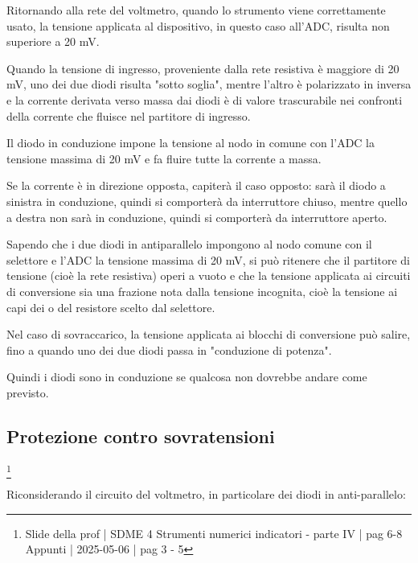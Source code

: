 Ritornando alla rete del voltmetro, quando lo strumento viene correttamente usato, la tensione applicata al dispositivo, in questo caso all'ADC, risulta non superiore a 20 mV. \newline

Quando la tensione di ingresso, proveniente dalla rete resistiva è maggiore di 20 mV, uno dei due diodi risulta "sotto soglia", mentre l'altro è polarizzato in inversa 
e la corrente derivata verso massa dai diodi è di valore trascurabile nei confronti della corrente che fluisce nel partitore di ingresso. \newline 

Il diodo in conduzione impone la tensione al nodo in comune con l'ADC la tensione massima di 20 mV e fa fluire tutte la corrente a massa. \newline 

Se la corrente è in direzione opposta, capiterà il caso opposto: sarà il diodo a sinistra in conduzione, quindi si comporterà da interruttore chiuso, mentre quello a destra non sarà in conduzione, 
quindi si comporterà da interruttore aperto. \newline 

Sapendo che i due diodi in antiparallelo impongono al nodo comune con il selettore e l'ADC la tensione massima di 20 mV, 
si può ritenere che il partitore di tensione (cioè la rete resistiva) operi a vuoto e che la tensione applicata ai circuiti di conversione sia una frazione nota dalla tensione incognita, 
cioè la tensione ai capi dei o del resistore scelto dal selettore. \newline 

Nel caso di sovraccarico, la tensione applicata ai blocchi di conversione può salire, fino a quando uno dei due diodi passa in "conduzione di potenza". \newline 

Quindi i diodi sono in conduzione se qualcosa non dovrebbe andare come previsto. \newline 

\newpage 

\subsection{Protezione contro sovratensioni}
\footnote{Slide della prof | SDME 4 Strumenti numerici indicatori - parte IV | pag 6-8 \\  
Appunti | 2025-05-06 | pag 3 - 5}

Riconsiderando il circuito del voltmetro, in particolare dei diodi in anti-parallelo: 

